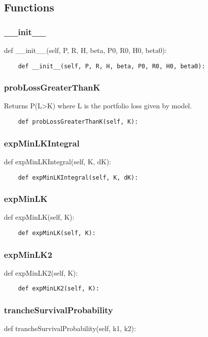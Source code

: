 \documentclass[twoside,11pt]{book}
\begin{document}
\subsection*{Functions}

\subsubsection*{{\bf \_\_init\_\_}}
def \_\_init\_\_(self, P, R, H, beta, P0, R0, H0, beta0): 

\begin{lstlisting}
    def __init__(self, P, R, H, beta, P0, R0, H0, beta0):
\end{lstlisting}

\subsubsection*{{\bf probLossGreaterThanK}}
Returns P(L>K) where L is the portfolio loss given by model.  

\begin{lstlisting}
    def probLossGreaterThanK(self, K):
\end{lstlisting}

\subsubsection*{{\bf expMinLKIntegral}}
def expMinLKIntegral(self, K, dK): 

\begin{lstlisting}
    def expMinLKIntegral(self, K, dK):
\end{lstlisting}

\subsubsection*{{\bf expMinLK}}
def expMinLK(self, K): 

\begin{lstlisting}
    def expMinLK(self, K):
\end{lstlisting}

\subsubsection*{{\bf expMinLK2}}
def expMinLK2(self, K): 

\begin{lstlisting}
    def expMinLK2(self, K):
\end{lstlisting}

\subsubsection*{{\bf trancheSurvivalProbability}}
def trancheSurvivalProbability(self, k1, k2): 
\end{document}
